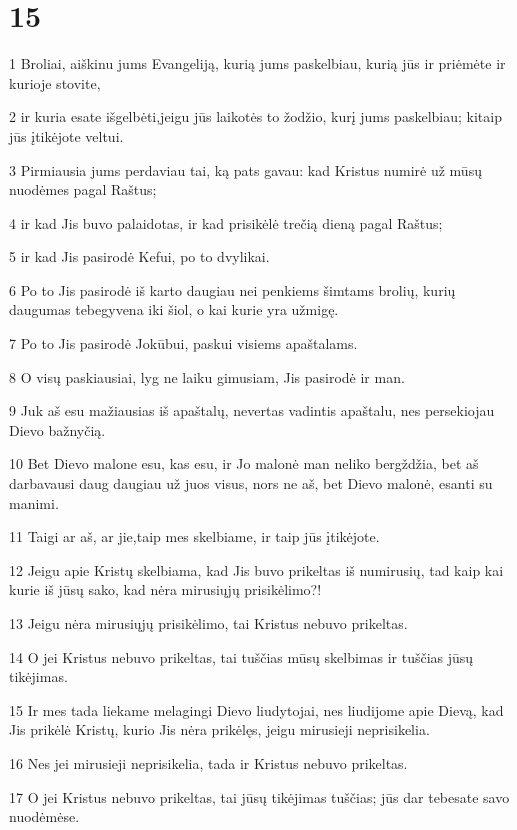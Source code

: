 \chapter{15}


\par 1 Broliai, aiškinu jums Evangeliją, kurią jums paskelbiau, kurią jūs ir priėmėte ir kurioje stovite, 
\par 2 ir kuria esate išgelbėti,­jeigu jūs laikotės to žodžio, kurį jums paskelbiau; kitaip jūs įtikėjote veltui. 
\par 3 Pirmiausia jums perdaviau tai, ką pats gavau: kad Kristus numirė už mūsų nuodėmes pagal Raštus; 
\par 4 ir kad Jis buvo palaidotas, ir kad prisikėlė trečią dieną pagal Raštus; 
\par 5 ir kad Jis pasirodė Kefui, po to dvylikai. 
\par 6 Po to Jis pasirodė iš karto daugiau nei penkiems šimtams brolių, kurių daugumas tebegyvena iki šiol, o kai kurie yra užmigę. 
\par 7 Po to Jis pasirodė Jokūbui, paskui visiems apaštalams. 
\par 8 O visų paskiausiai, lyg ne laiku gimusiam, Jis pasirodė ir man. 
\par 9 Juk aš esu mažiausias iš apaštalų, nevertas vadintis apaštalu, nes persekiojau Dievo bažnyčią. 
\par 10 Bet Dievo malone esu, kas esu, ir Jo malonė man neliko bergždžia, bet aš darbavausi daug daugiau už juos visus, nors ne aš, bet Dievo malonė, esanti su manimi. 
\par 11 Taigi ar aš, ar jie,­taip mes skelbiame, ir taip jūs įtikėjote. 
\par 12 Jeigu apie Kristų skelbiama, kad Jis buvo prikeltas iš numirusių, tad kaip kai kurie iš jūsų sako, kad nėra mirusiųjų prisikėlimo?! 
\par 13 Jeigu nėra mirusiųjų prisikėlimo, tai Kristus nebuvo prikeltas. 
\par 14 O jei Kristus nebuvo prikeltas, tai tuščias mūsų skelbimas ir tuščias jūsų tikėjimas. 
\par 15 Ir mes tada liekame melagingi Dievo liudytojai, nes liudijome apie Dievą, kad Jis prikėlė Kristų, kurio Jis nėra prikėlęs, jeigu mirusieji neprisikelia. 
\par 16 Nes jei mirusieji neprisikelia, tada ir Kristus nebuvo prikeltas. 
\par 17 O jei Kristus nebuvo prikeltas, tai jūsų tikėjimas tuščias; jūs dar tebesate savo nuodėmėse. 
